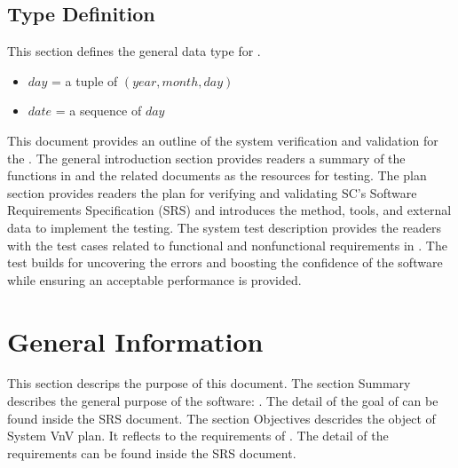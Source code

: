 \documentclass[12pt, titlepage]{article}
\begin{document}
\subsection{Type Definition}\label{C_TD}
This section defines the general data type for \progname. 

\begin{itemize}
\item[]$\mathit{day} $ = a tuple of $(\mathit{year}, \mathit{month}, \mathit{day} )$
\item[]$\mathit{date}$ = a sequence of $\mathit{day}$
\end{itemize} 




\newpage


This document provides an outline of the system verification and validation for
the \progname. The general introduction section provides readers a summary of
the functions in \progname{} and the related documents as the resources for
testing. The plan section provides readers the plan for verifying and
validating SC's Software Requirements Specification (SRS) and introduces the
method, tools, and external data to implement the testing. The system test
description
provides the readers with the test cases related to functional and nonfunctional
requirements in \progname. The test builds for uncovering the errors and
boosting the confidence of the software while ensuring an acceptable
performance is provided. 



\section{General Information}

This section descrips the purpose of this document. The section Summary describes the general purpose of the software: \progname. The detail of the goal of \progname can be found inside the SRS document. The section Objectives descrides the object of  System VnV plan. It reflects to the requirements of \progname. The detail of the requirements can be found inside the SRS document. 
\end{document}
